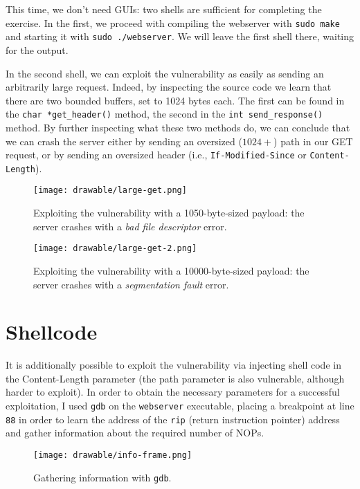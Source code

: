\documentclass[a4paper,11pt,hidelinks]{article}
\begin{document}
This time, we don't need GUIs: two shells are sufficient for completing the exercise. In the first, we proceed with compiling the webserver with \verb=sudo make= and starting it with \verb=sudo ./webserver=. We will leave the first shell there, waiting for the output.

In the second shell, we can exploit the vulnerability as easily as sending an arbitrarily large request. Indeed, by inspecting the source code we learn that there are two bounded buffers, set to 1024 bytes each. The first can be found in the \verb=char *get_header()= method, the second in the \verb=int send_response()= method. By further inspecting what these two methods do, we can conclude that we can crash the server either by sending an oversized ($1024+$) path in our GET request, or by sending an oversized header (i.e., \verb=If-Modified-Since= or \verb=Content-Length=).

\begin{figure}[h!]
  \centering
  \texttt{[image: drawable/large-get.png]}
  \caption{Exploiting the vulnerability with a 1050-byte-sized payload: the server crashes with a \textit{bad file descriptor} error.}
\end{figure}

\begin{figure}[h!]
  \centering
  \texttt{[image: drawable/large-get-2.png]}
  \caption{Exploiting the vulnerability with a 10000-byte-sized payload: the server crashes with a \textit{segmentation fault} error.}
\end{figure}

\newpage

\section{Shellcode}

It is additionally possible to exploit the vulnerability via injecting shell code in the Content-Length parameter (the path parameter is also vulnerable, although harder to exploit). In order to obtain the necessary parameters for a successful exploitation, I used \verb=gdb= on the \verb=webserver= executable, placing a breakpoint at line \verb=88= in order to learn the address of the \verb=rip= (return instruction pointer) address and gather information about the required number of NOPs. 

\begin{figure}[h!]
  \centering
  \texttt{[image: drawable/info-frame.png]}
  \caption{Gathering information with \texttt{gdb}.}
\end{figure}
\end{document}
